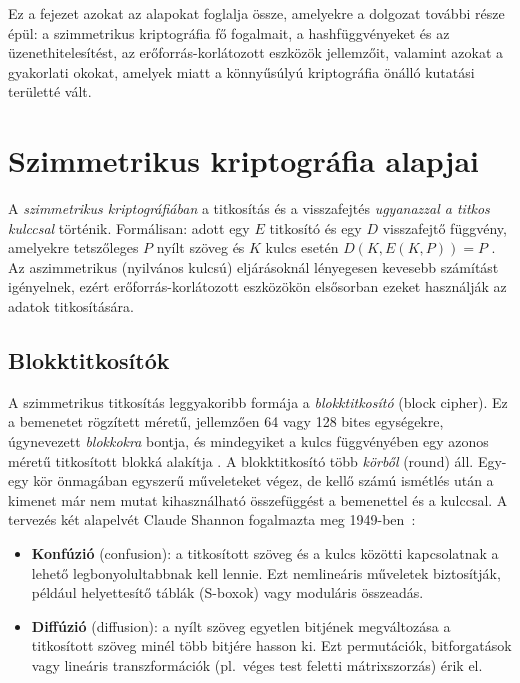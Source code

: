 \documentclass[a4paper,12pt]{report}
\theoremstyle{definition}
\theoremstyle{remark}
\begin{document}
Ez a fejezet azokat az alapokat foglalja össze, amelyekre a dolgozat további része épül: a szimmetrikus kriptográfia fő fogalmait, a hashfüggvényeket és az üzenethitelesítést, az erőforrás-korlátozott eszközök jellemzőit, valamint azokat a gyakorlati okokat, amelyek miatt a könnyűsúlyú kriptográfia önálló kutatási területté vált.

\section{Szimmetrikus kriptográfia alapjai}\label{sec:szimmetrikus}

A \emph{szimmetrikus kriptográfiában} a titkosítás és a visszafejtés \emph{ugyanazzal a titkos kulccsal} történik. Formálisan: adott egy $E$ titkosító és egy $D$ visszafejtő függvény, amelyekre tetszőleges $P$ nyílt szöveg és $K$ kulcs esetén $D(K, E(K, P)) = P$ \cite{Stallings2017}. Az aszimmetrikus (nyilvános kulcsú) eljárásoknál lényegesen kevesebb számítást igényelnek, ezért erőforrás-korlátozott eszközökön elsősorban ezeket használják az adatok titkosítására.

\subsection{Blokktitkosítók}

A szimmetrikus titkosítás leggyakoribb formája a \emph{blokktitkosító} (block cipher). Ez a bemenetet rögzített méretű, jellemzően 64 vagy 128 bites egységekre, úgynevezett \emph{blokkokra} bontja, és mindegyiket a kulcs függvényében egy azonos méretű titkosított blokká alakítja \cite{Paar2010}. A blokktitkosító több \emph{körből} (round) áll. Egy-egy kör önmagában egyszerű műveleteket végez, de kellő számú ismétlés után a kimenet már nem mutat kihasználható összefüggést a bemenettel és a kulccsal. A tervezés két alapelvét Claude Shannon fogalmazta meg 1949-ben~\cite{Shannon1949}:

\begin{itemize}
	\item \textbf{Konfúzió} (confusion): a titkosított szöveg és a kulcs közötti kapcsolatnak a lehető legbonyolultabbnak kell lennie. Ezt nemlineáris műveletek biztosítják, például helyettesítő táblák (S-boxok) vagy moduláris összeadás.
	\item \textbf{Diffúzió} (diffusion): a nyílt szöveg egyetlen bitjének megváltozása a titkosított szöveg minél több bitjére hasson ki. Ezt permutációk, bitforgatások vagy lineáris transzformációk (pl.~véges test feletti mátrixszorzás) érik el.
\end{itemize}
\end{document}
